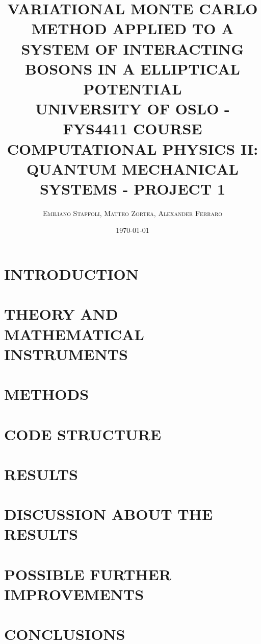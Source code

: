 \documentclass[a4paper, twocolumn]{article}
\title{\LARGE VARIATIONAL MONTE CARLO METHOD APPLIED TO A SYSTEM OF INTERACTING BOSONS IN A ELLIPTICAL POTENTIAL \\ \vspace{4mm}  \large UNIVERSITY OF OSLO - FYS4411 COURSE \\ \large COMPUTATIONAL PHYSICS II: QUANTUM MECHANICAL SYSTEMS - PROJECT 1 }
\author{\textsc{Emiliano Staffoli, Matteo Zortea, Alexander Ferraro} }
\date{\today}
\begin{document}
\setcounter{page}{1}

\twocolumn[{
\maketitle

\vspace{12mm}
}]


\section{INTRODUCTION}
\label{sec:introduction}
   


\section{THEORY AND MATHEMATICAL INSTRUMENTS}
\label{sec:theory}
    
   
\section{METHODS}
\label{sec:methods}
    
    
\section{CODE STRUCTURE}
\label{sec:code}



\section{RESULTS}
\label{sec:results}


\section{DISCUSSION ABOUT THE RESULTS}
\label{sec:discussion}


\section{POSSIBLE FURTHER IMPROVEMENTS}
\label{sec:improvements}


\section{CONCLUSIONS}
\label{sec:conclusions}

\end{document}
